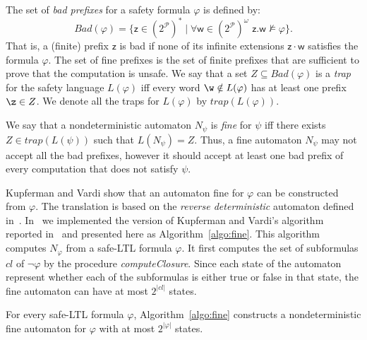 The set of \emph{bad prefixes} for a safety formula $\varphi$ is defined by:
$$Bad(\varphi) = \{\mathsf{z} \in (2^{\mathcal{P}})^{*} \mid \forall \mathsf{w} \in (2^{\mathcal{P}})^{\omega}\,\,  \mathsf{z}.\mathsf{w} \not\models \varphi\}.$$
That is, a (finite) prefix $\mathsf{z}$ is bad if none of its infinite extensions $\mathsf{z}\cdot\mathsf{w}$ 
satisfies the formula $\varphi$.
The set of fine prefixes is the set of finite prefixes that are sufficient to prove that the computation is unsafe.
We say that a set $Z \subseteq Bad(\varphi)$ is a \emph{trap} for the safety language $L(\varphi)$ iff
every word $\w \notin L(\varphi)$ has at least one prefix $\z \in Z$.  
We denote all the traps for $L(\varphi)$ by $trap(L(\varphi))$.

We say that a nondeterministic automaton $N_{\psi}$ is \emph{fine} for $\psi$ iff 
there exists $Z \in trap(L(\psi))$ such that $L(N_{\psi}) = Z$.
Thus, a fine automaton $N_{\psi}$ may not accept all the bad prefixes, however
it should accept at least one bad prefix of every computation that does not satisfy $\psi$.


Kupferman and Vardi \cite{KV01,KupfermanL06} show that an automaton fine for $\varphi$ can
be constructed from $\varphi$.
The translation is based on the \emph{reverse deterministic} automaton defined 
in~\cite{VardiW94}. 
In \tool~we implemented the version of Kupferman and Vardi's algorithm reported in~\cite{Lat03} and 
presented here as Algorithm~\ref{algo:fine}. 
This algorithm computes $N_{\varphi}$ from a safe-LTL formula $\varphi$. 
It first computes the set of subformulas $cl$ of $\lnot \varphi$ by the procedure
\emph{computeClosure}.
Since each state of the automaton represent whether each of the subformulas is either 
true or false in that state, the fine automaton can have at most $2^{|cl|}$ states.

\begin{proposition}
For every safe-LTL formula $\varphi$, Algorithm~\ref{algo:fine} constructs a
nondeterministic fine automaton for $\varphi$ with at most $2^{|\varphi|}$ states. 
\end{proposition}





